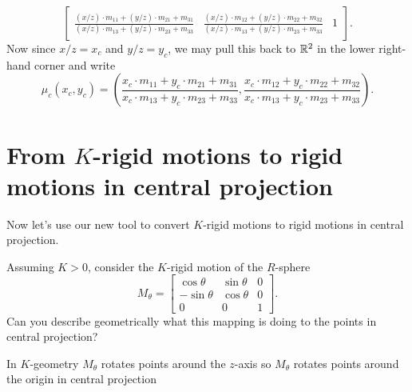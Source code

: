 \documentclass{ximera}
\begin{document}
\begin{problem}
\begin{freeResponse}
    \[
    \begin{bmatrix}
      \frac{(x/z)\cdot m_{11}+(y/z)\cdot m_{21}+m_{31}}{(x/z)\cdot m_{13}+(y/z)\cdot m_{23}+m_{33}}
      &
      \frac{(x/z)\cdot m_{12}+(y/z)\cdot m_{22}+m_{32}}{(x/z)\cdot m_{13}+(y/z)\cdot m_{23}+m_{33}}
      & 1
    \end{bmatrix}.
    \]
    Now since $x/z = x_c$ and $y/z =y_c$, we may pull this back to
    $\mathbb R^2$ in the lower right-hand corner and write
    \[
    \mu_c(x_c,y_c) = \left(
    \frac{x_c\cdot m_{11} + y_c\cdot m_{21} + m_{31}}{x_c\cdot m_{13} + y_c\cdot m_{23} + m_{33}},
    \frac{x_c\cdot m_{12} + y_c\cdot m_{22} + m_{32}}{x_c\cdot m_{13} + y_c\cdot m_{23} + m_{33}}
    \right).
    \]
  \end{freeResponse}
\end{problem}


\section{From $K$-rigid motions to rigid motions in central projection}

Now let's use our new tool to convert $K$-rigid motions to rigid motions in central projection. 



\begin{problem}
  Assuming $K > 0$, consider the $K$-rigid motion of the $R$-sphere
  \[
  M_\theta=
  \begin{bmatrix}
    \cos\theta & \sin\theta & 0\\
    -\sin\theta & \cos\theta & 0\\
    0 & 0 & 1
  \end{bmatrix}.
  \]
  Can you describe geometrically what this mapping is doing to the
  points in central projection?
  
  \begin{freeResponse}
  In $K$-geometry $M_\theta$ rotates points around the $z$-axis so $M_\theta$ rotates points around the origin in central projection
  \end{freeResponse}
\end{problem}
\end{document}
